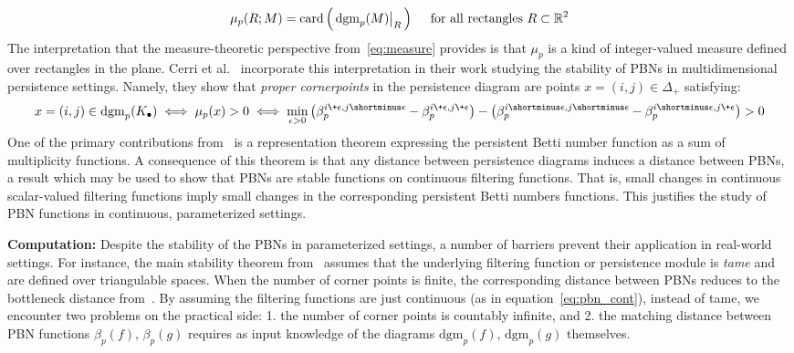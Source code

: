 \begin{equation}\label{eq:measure}
	\mu_p(R; M) = \mathrm{card}\left( \,
	\restr{\mathrm{dgm}_p(M)}{R} \,
	\right) \quad \text{ for all rectangles } R \subset \mathbb{R}^2 
\end{equation}
The interpretation that the measure-theoretic perspective from~\eqref{eq:measure} provides is that $\mu_p$ is a kind of integer-valued measure defined over rectangles in the plane. Cerri et al.~\cite{cerri2013betti} incorporate this interpretation in their work studying the stability of PBNs in multidimensional persistence settings. Namely, they show that \emph{proper cornerpoints} in the persistence diagram are points $x = (i,j) \in \Delta_+$ satisfying:
\begin{equation}\label{eq:pbn_cont}
	x = (i,j) \in \mathrm{dgm}_p(K_\bullet) \; \Longleftrightarrow \; \mu_p(x) > 0 \; \Longleftrightarrow \; \min_{\epsilon > 0} \left(\beta_p^{i \+ \epsilon, j \shortminus \epsilon} - \beta_p^{i \+ \epsilon, j \+ \epsilon} \right) - \left(\beta_p^{i \shortminus \epsilon, j \shortminus \epsilon} - \beta_p^{i \shortminus \epsilon, j \+ \epsilon} \right) > 0
\end{equation}
One of the primary contributions from~\cite{cerri2013betti} is a representation theorem expressing the persistent Betti number function as a sum of multiplicity functions. A consequence of this theorem is that any distance between persistence diagrams induces a distance between PBNs, a result which may be used to show that PBNs are stable functions on continuous filtering functions. 
That is, small changes in continuous scalar-valued filtering functions imply small changes in the corresponding persistent Betti numbers functions. 
This justifies the study of PBN functions in continuous, parameterized settings. 

\textbf{Computation:} Despite the stability of the PBNs in parameterized settings, a number of barriers prevent their application in real-world settings. For instance, the main stability theorem from~\cite{cohen2005stability} assumes that the underlying filtering function or persistence module is \emph{tame} and are defined over triangulable spaces. When the number of corner points is finite, the corresponding distance between PBNs reduces to the bottleneck distance from~\cite{cohen2005stability}. 
By assuming the filtering functions are just continuous (as in equation~\eqref{eq:pbn_cont}), instead of tame, we encounter two problems on the practical side: 1. the number of corner points is countably infinite, and 2. the matching distance between PBN functions $\beta_p(f), \, \beta_p(g)$ requires as input knowledge of the diagrams $\mathrm{dgm}_p(f), \, \mathrm{dgm}_p(g)$ themselves. 







